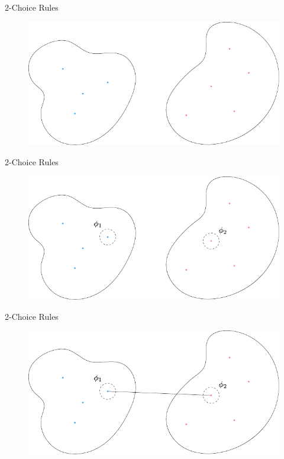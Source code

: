 \documentclass{beamer}
\begin{document}
\begin{frame}{2-Choice Rules}
	\begin{figure}[H]
		\centering
		\includegraphics[scale=0.8]{fig/2choice-1.pdf}
	\end{figure}
\end{frame}
\begin{frame}{2-Choice Rules}
	\begin{figure}[H]
		\centering
		\includegraphics[scale=0.8]{fig/2choice-2.pdf}
	\end{figure}
\end{frame}
\begin{frame}{2-Choice Rules}
        \begin{figure}[H]
                \centering
                \includegraphics[scale=0.8]{fig/2choice-3.pdf}
        \end{figure}
\end{frame}
\end{document}

